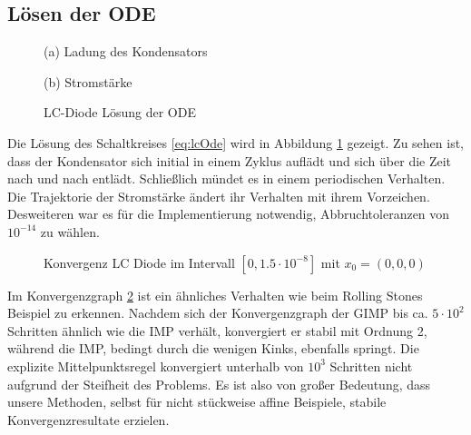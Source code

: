 \subsection{Lösen der ODE}
\begin{figure}[H]
\footnotesize 
\centering
\begin{minipage}[b]{0.49\linewidth}

\caption*{(a) Ladung des Kondensators}
\end{minipage}
\begin{minipage}[b]{0.49\linewidth}

\caption*{(b) Stromstärke}
\end{minipage}
\caption{LC-Diode Lösung der ODE}
\label{fig:lc_solution}
\end{figure}
Die Lösung des Schaltkreises \eqref{eq:lcOde} wird in Abbildung \ref{fig:lc_solution} gezeigt. Zu sehen ist, dass der Kondensator sich initial in einem Zyklus auflädt und sich über die Zeit nach und nach entlädt. Schließlich mündet es in einem periodischen Verhalten. Die Trajektorie der Stromstärke ändert ihr Verhalten mit ihrem Vorzeichen. Desweiteren war es für die Implementierung notwendig, Abbruchtoleranzen von $10^{-14}$ zu wählen. 

\begin{figure}
\centering

\caption{Konvergenz LC Diode im Intervall $[0,1.5\cdot 10^{-8}]$ mit $x_0=(0,0,0)$}
\label{fig:lcConvergence}
\end{figure}
Im Konvergenzgraph \ref{fig:lcConvergence} ist ein ähnliches Verhalten wie beim Rolling Stones Beispiel zu erkennen. Nachdem sich der Konvergenzgraph der GIMP bis ca. $5\cdot 10^2$ Schritten ähnlich wie die IMP verhält, konvergiert er stabil mit Ordnung 2, während die IMP, bedingt durch die wenigen Kinks, ebenfalls springt. Die explizite Mittelpunktsregel konvergiert unterhalb von $10^3$ Schritten nicht aufgrund der Steifheit des Problems.
Es ist also von großer Bedeutung, dass unsere Methoden, selbst für nicht stückweise affine Beispiele, stabile Konvergenzresultate erzielen.

